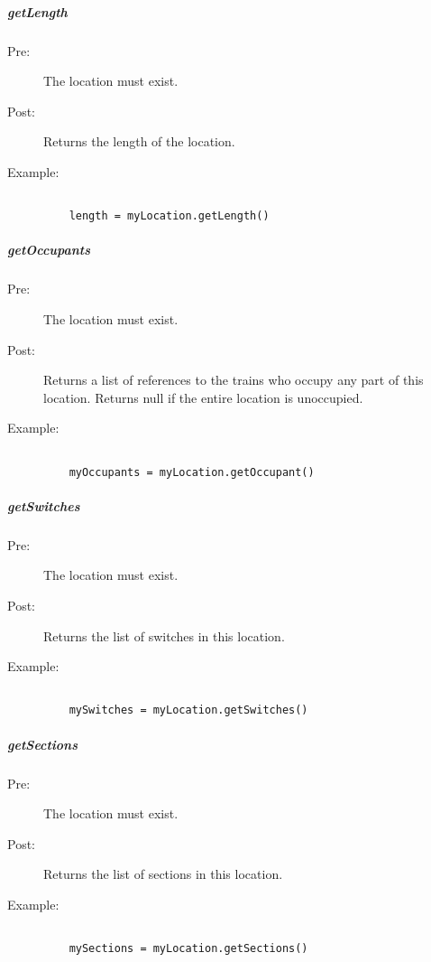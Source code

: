 \documentclass[a4paper,11pt,notitlepage]{article}
\begin{document}
\subparagraph{getLength}
\begin{description}
\item[\hspace{1cm}Pre:] The location must exist.
\item[\hspace{1cm}Post:] Returns the length of the location.
\item[\hspace{1cm}Example:]
\begin{verbatim}

    length = myLocation.getLength()
\end{verbatim}
\end{description}

\subparagraph{getOccupants}
\begin{description}
\item[\hspace{1cm}Pre:] The location must exist.
\item[\hspace{1cm}Post:] Returns a list of references to the trains who occupy any part of this location. Returns null if the entire location is unoccupied.
\item[\hspace{1cm}Example:]
\begin{verbatim}

    myOccupants = myLocation.getOccupant()
\end{verbatim}
\end{description}

\subparagraph{getSwitches}
\begin{description}
\item[\hspace{1cm}Pre:] The location must exist.
\item[\hspace{1cm}Post:] Returns the list of switches in this location.
\item[\hspace{1cm}Example:]
\begin{verbatim}

    mySwitches = myLocation.getSwitches()
\end{verbatim}
\end{description}

\subparagraph{getSections}
\begin{description}
\item[\hspace{1cm}Pre:] The location must exist.
\item[\hspace{1cm}Post:] Returns the list of sections in this location.
\item[\hspace{1cm}Example:]
\begin{verbatim}

    mySections = myLocation.getSections()
\end{verbatim}
\end{description}
\end{document}
